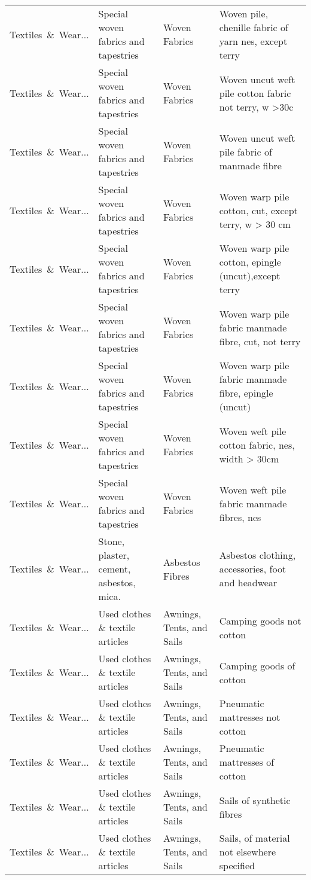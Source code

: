 \begin{appendices}
\begin{xltabular}{\textwidth}{|p{0.10\textwidth}|p{0.25\textwidth}|p{0.24\textwidth}|p{0.31\textwidth}|}
Textiles\ \&\ Wear... & Special woven fabrics and tapestries & Woven Fabrics & Woven pile, chenille fabric of yarn nes, except terry \\
Textiles\ \&\ Wear... & Special woven fabrics and tapestries & Woven Fabrics & Woven uncut weft pile cotton fabric not terry, w >30c \\
Textiles\ \&\ Wear... & Special woven fabrics and tapestries & Woven Fabrics & Woven uncut weft pile fabric of manmade fibre \\
Textiles\ \&\ Wear... & Special woven fabrics and tapestries & Woven Fabrics & Woven warp pile cotton, cut, except terry, w > 30 cm \\
Textiles\ \&\ Wear... & Special woven fabrics and tapestries & Woven Fabrics & Woven warp pile cotton, epingle (uncut),except terry \\
Textiles\ \&\ Wear... & Special woven fabrics and tapestries & Woven Fabrics & Woven warp pile fabric manmade fibre, cut, not terry \\
Textiles\ \&\ Wear... & Special woven fabrics and tapestries & Woven Fabrics & Woven warp pile fabric manmade fibre, epingle (uncut) \\
Textiles\ \&\ Wear... & Special woven fabrics and tapestries & Woven Fabrics & Woven weft pile cotton fabric, nes, width > 30cm \\
Textiles\ \&\ Wear... & Special woven fabrics and tapestries & Woven Fabrics & Woven weft pile fabric manmade fibres, nes \\
Textiles\ \&\ Wear... & Stone, plaster, cement, asbestos, mica. & Asbestos Fibres & Asbestos clothing, accessories, foot and headwear \\
Textiles\ \&\ Wear... & Used clothes \& textile articles & Awnings, Tents, and Sails & Camping goods not cotton \\
Textiles\ \&\ Wear... & Used clothes \& textile articles & Awnings, Tents, and Sails & Camping goods of cotton \\
Textiles\ \&\ Wear... & Used clothes \& textile articles & Awnings, Tents, and Sails & Pneumatic mattresses not cotton \\
Textiles\ \&\ Wear... & Used clothes \& textile articles & Awnings, Tents, and Sails & Pneumatic mattresses of cotton \\
Textiles\ \&\ Wear... & Used clothes \& textile articles & Awnings, Tents, and Sails & Sails of synthetic fibres \\
Textiles\ \&\ Wear... & Used clothes \& textile articles & Awnings, Tents, and Sails & Sails, of material not elsewhere specified \\

\end{xltabular}
\end{appendices}

